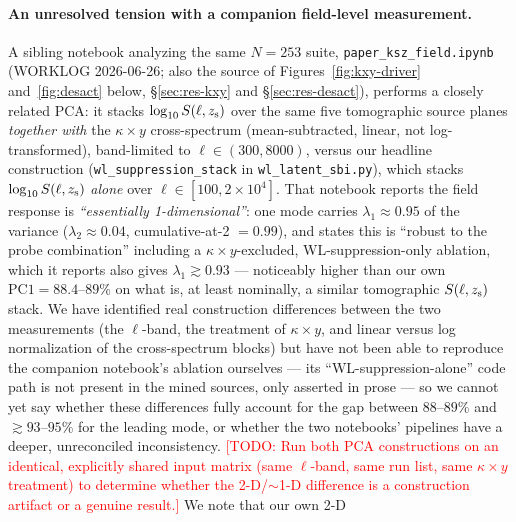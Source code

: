\documentclass[11pt]{article}
\newcommand{\kappay}{\kappa\times y}
\newcommand{\sez}{S(\ell, z_{\rm s})}
\newcommand{\todo}[1]{\textcolor{red}{[TODO: #1]}}
\begin{document}
\paragraph{An unresolved tension with a companion field-level measurement.}
A sibling notebook analyzing the same $N=253$ suite,
\texttt{paper\_ksz\_field.ipynb} (WORKLOG 2026-06-26; also the source of
Figures~\ref{fig:kxy-driver} and~\ref{fig:desact} below, \S\ref{sec:res-kxy}
and \S\ref{sec:res-desact}), performs a closely related PCA: it stacks
$\log_{10}\sez$ over the same five tomographic source planes \emph{together
with} the $\kappay$ cross-spectrum (mean-subtracted, linear, not
log-transformed), band-limited to $\ell\in(300,8000)$, versus our headline
construction (\texttt{wl\_suppression\_stack} in \texttt{wl\_latent\_sbi.py}),
which stacks $\log_{10}\sez$ \emph{alone} over $\ell\in[100,2\times10^4]$.
That notebook reports the field response is \emph{``essentially
1-dimensional''}: one mode carries $\lambda_1\approx0.95$ of the variance
($\lambda_2\approx0.04$, cumulative-at-2 $=0.99$), and states this is
``robust to the probe combination'' including a $\kappay$-excluded,
WL-suppression-only ablation, which it reports also gives
$\lambda_1\gtrsim0.93$ — noticeably higher than our own $\mathrm{PC1}=88.4$–$89\%$
on what is, at least nominally, a similar tomographic $\sez$ stack. %
We have identified real construction differences between the two
measurements (the $\ell$-band, the treatment of $\kappay$, and linear
versus log normalization of the cross-spectrum blocks) but have not been
able to reproduce the companion notebook's ablation ourselves — its
``WL-suppression-alone'' code path is not present in the mined sources, only
asserted in prose — so we cannot yet say whether these differences fully
account for the gap between $88$–$89\%$ and $\gtrsim\!93$–$95\%$ for the
leading mode, or whether the two notebooks' pipelines have a deeper,
unreconciled inconsistency. \todo{Run both PCA constructions on an
identical, explicitly shared input matrix (same $\ell$-band, same run list,
same $\kappay$ treatment) to determine whether the 2-D/$\sim$1-D difference
is a construction artifact or a genuine result.} We note that our own 2-D
\end{document}
